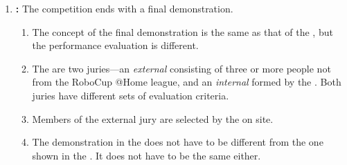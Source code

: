 \begin{enumerate}
	\item \textbf{:} The competition ends with a final demonstration.
	\begin{enumerate}
		\item The concept of the final demonstration is the same as that of the , but the performance evaluation is different. 
		\item The are two juries---an \emph{external} consisting of three or more people not from the RoboCup @Home league, and an \emph{internal} formed by the . Both juries have different sets of evaluation criteria.
		\item Members of the external jury are selected by the  on site. 
		\item The demonstration in the  does not have to be different from the one shown in the . It does not have to be the same either.
	\end{enumerate}
\end{enumerate}


